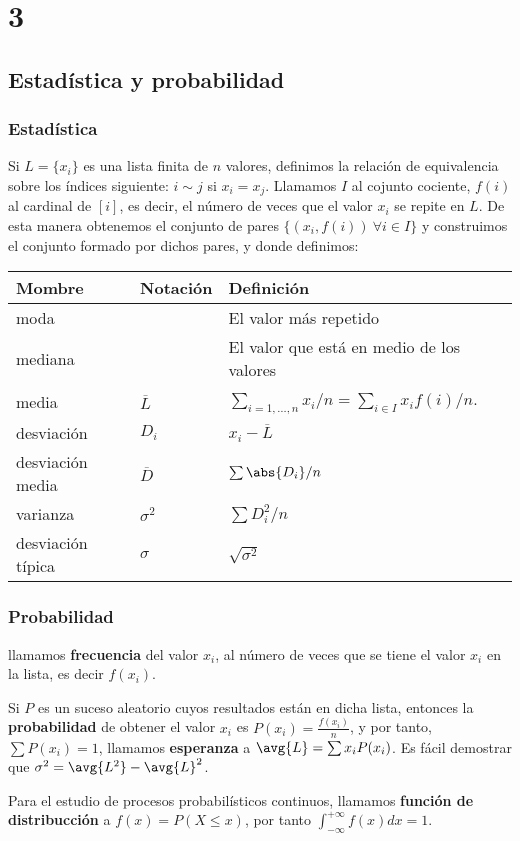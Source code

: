 \chapter{3}\label{ch:3}
\section{Estadística y probabilidad}
\subsection{Estadística}
Si $L=\{x_i\}$ es una lista finita de $n$ valores, definimos la relación de equivalencia sobre los índices siguiente: $i\sim j$ si $x_i = x_j$. Llamamos $I$ al cojunto cociente, $f(i)$ al cardinal de $[i]$, es decir, el número de veces que el valor $x_i$ se repite en $L$. De esta manera obtenemos el conjunto de pares $\{(x_i, f(i))\ \forall i\in I\}$ y construimos el conjunto formado por dichos pares, y donde  definimos:

\begin{tabular}{l|l|l}
	Mombre & Notación & Definición \\
	\hline
	moda & & El valor más repetido \\
	mediana & & El valor que está en medio de los valores \\
	media & $\overline{L}$ & $\sum_{i=1,\dots,n} x_i/n=\sum_{i\in I}x_if(i)/n$. \\
	desviación & $D_i$ & $x_i-\overline{L}$ \\
	desviación media & $\overline{D}$ & $\sum\abs{D_i}/n$ \\
	varianza & $\sigma^2$ & $\sum D_i^2/n$ \\
	desviación típica & $\sigma$ & $\sqrt{\sigma^2}$\\
\end{tabular}

\subsection{Probabilidad}
llamamos \textbf{frecuencia} del valor $x_i$, al número de veces que se tiene el valor $x_i$ en la lista, es decir $f(x_i)$.

Si $P$ es un suceso aleatorio cuyos resultados están en dicha lista, entonces la \textbf{probabilidad} de obtener el valor $x_i$ es $P(x_i)=\frac{f(x_i)}{n}$, y por tanto, $\sum P(x_i) = 1$, llamamos \textbf{esperanza} a $\avg{L} = \sum x_iP(x_i)$. Es fácil demostrar que $\sigma^2 = \avg{L^2}-\avg{L}^2$.

Para el estudio de procesos probabilísticos continuos, llamamos \textbf{función de distribucción} a $f(x) = P(X\leq x)$, por tanto $\int_{-\infty}^{+\infty}f(x)dx=1$.
